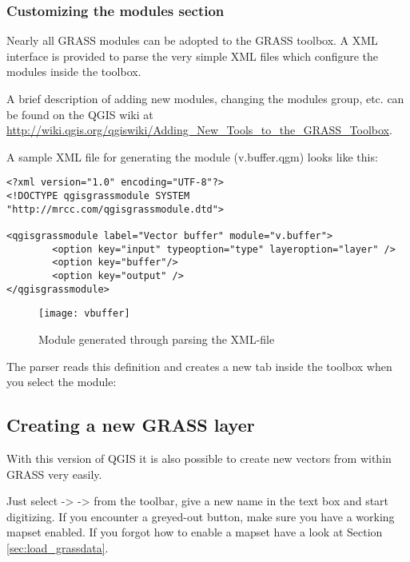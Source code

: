 \subsubsection{Customizing the modules section} 
\label{sec:toolbox-customizing}

Nearly all GRASS modules can be adopted to the GRASS toolbox. A XML interface is provided to parse
the very simple XML files which configure the modules inside the toolbox.

A brief description of adding new modules, changing the modules group, etc. can be found on the QGIS wiki
at \url{http://wiki.qgis.org/qgiswiki/Adding\_New\_Tools\_to\_the\_GRASS\_Toolbox}.

A sample XML file for generating the module  (v.buffer.qgm) looks like this:
\begin{verbatim}
<?xml version="1.0" encoding="UTF-8"?>
<!DOCTYPE qgisgrassmodule SYSTEM "http://mrcc.com/qgisgrassmodule.dtd">

<qgisgrassmodule label="Vector buffer" module="v.buffer">
        <option key="input" typeoption="type" layeroption="layer" />
        <option key="buffer"/>
        <option key="output" />
</qgisgrassmodule>
\end{verbatim}

\begin{figure}[ht]
\centering
\caption{Module generated through parsing the XML-file}\label{fig:buffer-module}
\texttt{[image: vbuffer]}
\end{figure}

The parser reads this definition and creates a new tab inside the toolbox when you select 
the module:


\subsection{Creating a new GRASS layer}\label{sec:creating_new_grass_vectors}

With this version of QGIS it is also possible to create new vectors from within GRASS very
easily.

Just select  ->  ->  from the toolbar, give a new name in the text box and start digitizing.
If you encounter a greyed-out button, make sure you have a working mapset enabled. If you forgot
how to enable a mapset have a look at Section \ref{sec:load_grassdata}.

